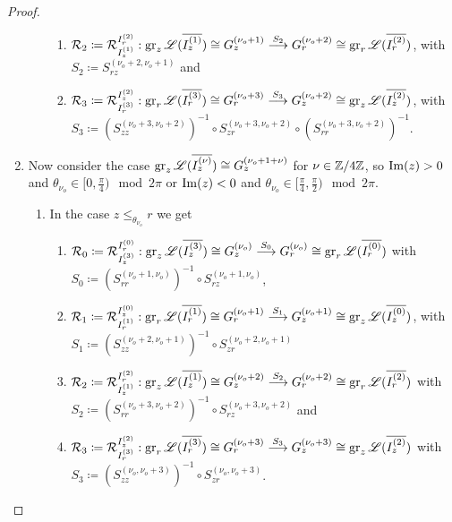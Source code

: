 \begin{proof}
\begin{enumerate}
\begin{enumerate}
\begin{enumerate}
        \item $\mathcal{R}_2 \coloneqq \mathcal{R}_{I_z^{(1)}}^{I_r^{(2)}}: \operatorname{gr}_z\mathscr{L}(\overline{I_z^{(1)}}) \cong G_z^{(\nu_o+1)} \overset{S_2}{\longrightarrow} G_r^{(\nu_o+2)} \cong \operatorname{gr}_r\mathscr{L}(\overline{I_r^{(2)}})$, with $S_2 \coloneqq  S_{rz}^{(\nu_o+2,\nu_o+1)}$ and 
        \item $\mathcal{R}_3 \coloneqq \mathcal{R}_{I_r^{(3)}}^{I_z^{(2)}}: \operatorname{gr}_r\mathscr{L}(\overline{I_r^{(3)}}) \cong G_r^{(\nu_o+3)} \overset{S_3}{\longrightarrow} G_z^{(\nu_o+2)} \cong \operatorname{gr}_z\mathscr{L}(\overline{I_z^{(2)}})$, with $S_3 \coloneqq (S_{zz}^{(\nu_o+3,\nu_o+2)})^{-1}\circ S_{zr}^{(\nu_o+3,\nu_o+2)} \circ (S_{rr}^{(\nu_o+3,\nu_o+2)})^{-1}$.
\end{enumerate}
\end{enumerate}


\item Now consider the case $\operatorname{gr}_z\mathscr{L}(\overline{I_z^{(\nu)}}) \cong G^{(\nu_o+1+\nu)}_z$ for $\nu \in \mathbb{Z}/4\mathbb{Z}$, so $\operatorname{Im}(z) > 0$ and $\theta_{\nu_o} \in [0,\frac{\pi}{4}) \mod 2\pi$ or $\operatorname{Im}(z) <0$ and $\theta_{\nu_o} \in [\frac{\pi}{4},\frac{\pi}{2}) \mod 2\pi$.
\begin{enumerate}
    \item In the case $z \leq_{\theta_{\nu_o}} r$ we get
    \begin{enumerate}
        \item $\mathcal{R}_0 \coloneqq \mathcal{R}_{I_z^{(3)}}^{I_r^{(0)}}: \operatorname{gr}_z\mathscr{L}(\overline{I_z^{(3)}}) \cong G_z^{(\nu_o)} \overset{S_0}{\longrightarrow} G_r^{(\nu_o)} \cong \operatorname{gr}_r\mathscr{L}(\overline{I_r^{(0)}})$ with $S_0 \coloneqq (S_{rr}^{(\nu_o+1,\nu_o)})^{-1} \circ S_{rz}^{(\nu_o+1,\nu_o)}$,
        \item $\mathcal{R}_1 \coloneqq \mathcal{R}_{I_r^{(1)}}^{I_z^{(0)}}: \operatorname{gr}_r\mathscr{L}(\overline{I_r^{(1)}}) \cong G_r^{(\nu_o+1)} \overset{S_1}{\longrightarrow} G_z^{(\nu_o+1)} \cong \operatorname{gr}_z\mathscr{L}(\overline{I_z^{(0)}})$, with $S_1 \coloneqq (S_{zz}^{(\nu_o+2,\nu_o+1)})^{-1} \circ S_{zr}^{(\nu_o+2, \nu_o+1)}$ 
        \item $\mathcal{R}_2 \coloneqq \mathcal{R}_{I_z^{(1)}}^{I_r^{(2)}}: \operatorname{gr}_z\mathscr{L}(\overline{I_z^{(1)}}) \cong G_z^{(\nu_o+2)} \overset{S_2}{\longrightarrow} G_r^{(\nu_o+2)} \cong \operatorname{gr}_r\mathscr{L}(\overline{I_r^{(2)}})$ with $S_2 \coloneqq (S_{rr}^{(\nu_o+3,\nu_o+2)})^{-1} \circ S_{rz}^{(\nu_o+3,\nu_o+2)}$ and
        \item $\mathcal{R}_3 \coloneqq \mathcal{R}_{I_r^{(3)}}^{I_z^{(2)}}: \operatorname{gr}_r\mathscr{L}(\overline{I_r^{(3)}}) \cong G_r^{(\nu_o+3)} \overset{S_3}{\longrightarrow} G_z^{(\nu_o+3)} \cong \operatorname{gr}_z\mathscr{L}(\overline{I_z^{(2)}})$ with $S_3 \coloneqq (S_{zz}^{(\nu_o,\nu_o+3)})^{-1} \circ S_{zr}^{(\nu_o, \nu_o+3)}$.

\end{enumerate}
\end{enumerate}
\end{enumerate}
\end{proof}
